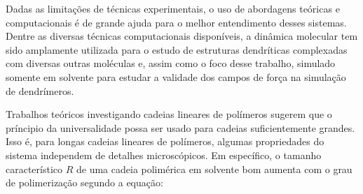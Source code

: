 Dadas as limitações de técnicas experimentais, o uso de abordagens teóricas e computacionais é de grande ajuda para o melhor entendimento desses sistemas.
Dentre as diversas técnicas computacionais disponíveis, a dinâmica molecular tem sido amplamente utilizada para o estudo de estruturas dendríticas complexadas com diversas outras moléculas\cite{Bellini2015, Caballero2013, DeFever2015, Jain2013, Kanchi2018, Tanis2009a} e, assim como o foco desse trabalho, simulado somente em solvente para estudar a validade dos campos de força na simulação de dendrímeros\cite{Maingi2012, Maiti2004, Maiti2005, Maiti2008, Opitz2006, Wu2010, Kavyani2014}.

Trabalhos teóricos investigando cadeias lineares de polímeros sugerem que o príncipio da universalidade possa ser usado para cadeias suficientemente grandes.
Isso é, para longas cadeias lineares de polímeros, algumas propriedades do sistema independem de detalhes microscópicos.
Em específico, o tamanho característico $R$ de uma cadeia polimérica em solvente bom aumenta com o grau de polimerização segundo a equação\cite{Ballauff2004}:

